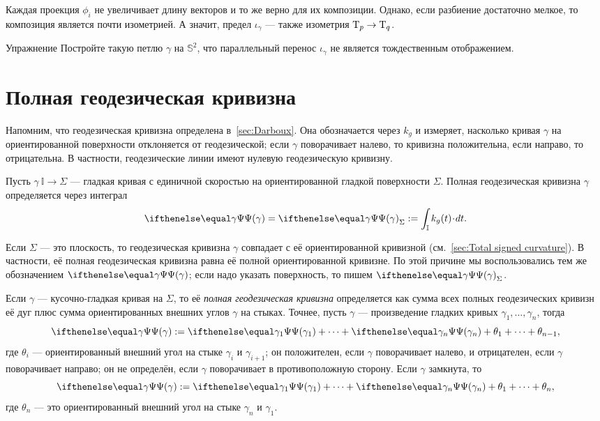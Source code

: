Каждая проекция $\phi_i$ не увеличивает длину векторов и то же верно для их композиции.
Однако, если разбиение достаточно мелкое, то композиция является почти изометрией.
А значит, предел $\iota_\gamma$ --- также изометрия $\T_p\z\to\T_q$.

\begin{thm}{Упражнение}\label{ex:holonomy=not0}
Постройте такую петлю $\gamma$ на $\mathbb{S}^2$, что параллельный перенос $\iota_\gamma$ не является тождественным отображением.
\end{thm}

\section{Полная геодезическая кривизна}

Напомним, что геодезическая кривизна определена в~\ref{sec:Darboux}.
Она обозначается через $k_g$ и измеряет, насколько кривая $\gamma$ на ориентированной поверхности отклоняется от геодезической;
если $\gamma$ поворачивает налево, то кривизна положительна, если направо, то отрицательна.
В частности, геодезические линии имеют нулевую геодезическую кривизну.

Пусть $\gamma\:\mathbb{I}\to \Sigma$ --- гладкая кривая с единичной скоростью на ориентированной гладкой поверхности $\Sigma$.
Полная геодезическая кривизна $\gamma$ определяется через интеграл 
\[\tgc\gamma=\tgc\gamma_\Sigma
\df
\int_{\mathbb{I}} k_g(t)\cdot dt.\]

Если $\Sigma$ --- это плоскость, то геодезическая кривизна $\gamma$ совпадает
с её ориентированной кривизной (см.~\ref{sec:Total signed curvature}).
В частности, её полная геодезическая кривизна равна её полной ориентированной кривизне.
По этой причине мы воспользовались тем же обозначением $\tgc\gamma$; если надо указать поверхность, то пишем $\tgc\gamma_\Sigma$.

Если $\gamma$ --- кусочно-гладкая кривая на $\Sigma$, то её \emph{полная геодезическая кривизна} определяется как сумма всех полных геодезических кривизн её дуг плюс сумма ориентированных внешних углов $\gamma$ на стыках.
Точнее, пусть $\gamma$ --- произведение гладких кривых $\gamma_1,\dots,\gamma_n$, тогда
\[\tgc\gamma
\df
\tgc{\gamma_1}+\dots+\tgc{\gamma_n}+\theta_1+\dots+\theta_{n-1},\]
где $\theta_i$ --- ориентированный внешний угол на стыке $\gamma_i$ и $\gamma_{i+1}$;
он положителен, если $\gamma$ поворачивает налево, и отрицателен, если $\gamma$ поворачивает направо; он не определён, если $\gamma$ поворачивает в противоположную сторону.
Если $\gamma$ замкнута, то 
\[\tgc\gamma
\df
\tgc{\gamma_1}+\dots+\tgc{\gamma_n}+\theta_1+\dots+\theta_n,\]
где $\theta_n$ --- это ориентированный внешний угол на стыке $\gamma_n$ и $\gamma_1$.

